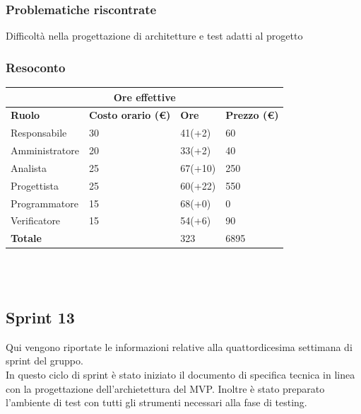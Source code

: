 \documentclass[9pt]{article}
\begin{document}
\subsubsection{Problematiche riscontrate}
Difficoltà nella progettazione di architetture e test adatti al progetto


\subsubsection{Resoconto}
\begin{center}
	\begin{tabularx}{\textwidth}{|X|X|X|X|}
		\hline
		\multicolumn{4}{|c|}{\textbf{Ore effettive}}                                      \\
		\hline
		\hline
		\textbf{Ruolo}  & \textbf{Costo orario (\euro)} & \textbf{Ore} & \textbf{Prezzo (\euro)} \\
		\hline
		Responsabile    & 30                            & 41(+2)       & 60                      \\
		\hline
		Amministratore  & 20                            & 33(+2)       & 40                      \\
		\hline
		Analista        & 25                            & 67(+10)       & 250                       \\
		\hline
		Progettista     & 25                            & 60(+22)       & 550                     \\
		\hline
		Programmatore   & 15                            & 68(+0)       & 0                     \\
		\hline
		Verificatore    & 15                            & 54(+6)       & 90                      \\
		\hline
		\hline
		\textbf{Totale} &                               & 323          & 6895                    \\
		\hline
	\end{tabularx}\\[8pt]
	\mbox{}\\
\end{center}


\subsection{Sprint 13}
Qui vengono riportate le informazioni relative alla quattordicesima settimana di sprint del gruppo. \\
In questo ciclo di sprint è stato iniziato il documento di specifica tecnica in linea con la progettazione dell'archietettura del MVP. 
Inoltre è stato preparato l'ambiente di test con tutti gli strumenti necessari alla fase di testing.\\
\end{document}
